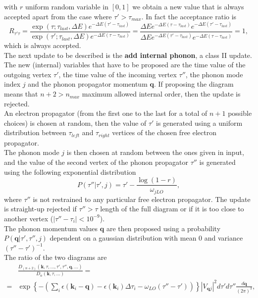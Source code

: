 with $r$ uniform random variable in $[0,1]$ we obtain a new value that is always accepted apart from the case where $\tau'>\tau_{max}$. In fact the acceptance ratio is
\begin{equation}
    R_{\tau'\tau}=\frac{\exp{\left(\tau;\tau_{last},\Delta E\right)}e^{-\Delta E(\tau'-\tau_{last})}}{\exp{\left(\tau';\tau_{last},\Delta E\right)}e^{-\Delta E (\tau-\tau_{last})}}=\frac{\Delta E e^{-\Delta E(\tau-\tau_{last})}e^{-\Delta E (\tau'-\tau_{last})}}{\Delta E e^{-\Delta E(\tau'-\tau_{last})}e^{-\Delta E (\tau-\tau_{last})}}=1,
\end{equation}
which is always accepted.\\
The next update to be described is the \textbf{add internal phonon}, a class II update. The new (internal) variables that have to be proposed 
are the time value of the outgoing vertex $\tau'$, the time value of the incoming vertex $\tau''$, the phonon mode index $j$ and the phonon propagator 
momentum $\mathbf{q}$. If proposing the diagram means that $n+2>n_{max}$ maximum allowed internal order, then the update is rejected.\\
An electron propagator (from the first one to the last for a total of $n+1$ possible choices) is chosen at random, then the value of $\tau'$ is generated 
using a uniform distribution between $\tau_{left}$ and $\tau_{right}$ vertices of the chosen free electron propagator.\\
The phonon mode $j$ is then chosen at random between the ones given in input, and the value of the second vertex of the phonon propagator $\tau''$ is generated using the
following exponential distribution
\begin{equation}
    P(\tau''|\tau',j)=\tau'-\frac{\log(1-r)}{\omega_{jLO}},
\end{equation}
where $\tau''$ is not restrained to any particular free electron propagator. The update is straight-up rejected if $\tau''>\tau$ length of the 
full diagram or if it is too close to another vertex ($|\tau''-\tau_i|<10^{-9}$).\\
The phonon momentum values $\mathbf{q}$ are then proposed using a probability $P(\mathbf{q}|\tau',\tau'',j)$ dependent on a gaussian distribution with 
mean $0$ and variance $(\tau''-\tau')^{-1}$.\\
The ratio of the two diagrams are
\begin{equation}
\begin{split}
    &\frac{D_{(n+2)}(\mathbf{k},\tau,...,\tau',\tau'',\mathbf{q},...)}{D_{n}(\mathbf{k},\tau,...)}=\\
    =&\exp{\left\{-\left(\sum_i\epsilon(\mathbf{k}_i-\mathbf{q})-\epsilon(\mathbf{k}_i)\Delta\tau_i-\omega_{LO}(\tau''-\tau')\right)\right\}}|V_{\mathbf{q}j}|^2d\tau'd\tau''\frac{d\mathbf{q}}{(2\pi)^3},
\end{split}
\end{equation}

